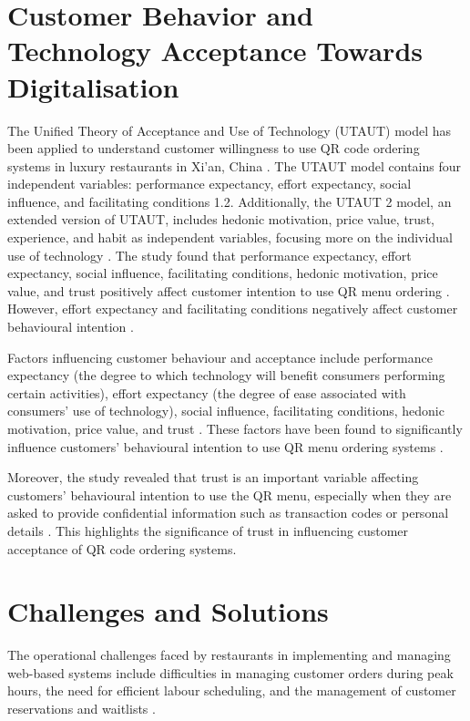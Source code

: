 \section{Customer Behavior and Technology Acceptance Towards Digitalisation}
The Unified Theory of Acceptance and Use of Technology (UTAUT) model has been applied to understand customer willingness to use QR code ordering systems in luxury restaurants in Xi'an, China \cite{5}. The UTAUT model contains four independent variables: performance expectancy, effort expectancy, social influence, and facilitating conditions 1.2. Additionally, the UTAUT 2 model, an extended version of UTAUT, includes hedonic motivation, price value, trust, experience, and habit as independent variables, focusing more on the individual use of technology \cite{5}. The study found that performance expectancy, effort expectancy, social influence, facilitating conditions, hedonic motivation, price value, and trust positively affect customer intention to use QR menu ordering \cite{5}. However, effort expectancy and facilitating conditions negatively affect customer behavioural intention \cite{5}.

Factors influencing customer behaviour and acceptance include performance expectancy (the degree to which technology will benefit consumers performing certain activities), effort expectancy (the degree of ease associated with consumers' use of technology), social influence, facilitating conditions, hedonic motivation, price value, and trust \cite{5}. These factors have been found to significantly influence customers' behavioural intention to use QR menu ordering systems \cite{5}.

Moreover, the study revealed that trust is an important variable affecting customers' behavioural intention to use the QR menu, especially when they are asked to provide confidential information such as transaction codes or personal details \cite{5}. This highlights the significance of trust in influencing customer acceptance of QR code ordering systems.

\section{Challenges and Solutions}
The operational challenges faced by restaurants in implementing and managing web-based systems include difficulties in managing customer orders during peak hours, the need for efficient labour scheduling, and the management of customer reservations and waitlists \cite{7}. 

